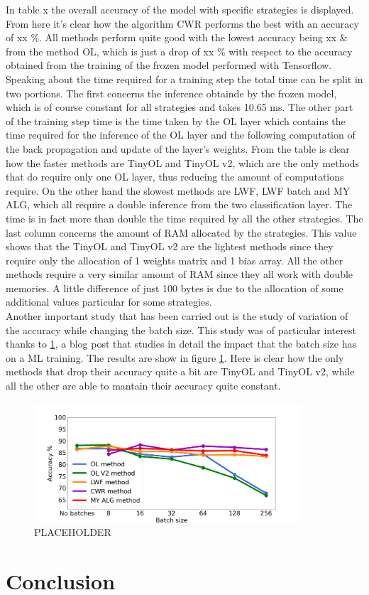 \documentclass[12pt]{report}
\begin{document}
In table x the overall accuracy of the model with specific strategies is displayed. From here it's clear how the algorithm CWR performs the best with an accuracy of xx \%. All methods perform quite good with the lowest accuracy being xx \& from the method OL, which is just a drop of xx \% with respect to the accuracy obtained from the training of the frozen model performed with Tensorflow. Speaking about the time required for a training step the total time can be split in two portions. The first concerns the inference obtainde by the frozen model, which is of course constant for all strategies and takes 10.65 ms. The other part of the training step time is the time taken by the OL layer which contains the time required for the inference of the OL layer and the following computation of the back propagation and update of the layer's weights. From the table is clear how the faster methods are TinyOL and TinyOL v2, which are the only methods that do require only one OL layer, thus reducing the amount of computations require. On the other hand the slowest methods are LWF, LWF batch and MY ALG, which all require a double inference from the two classification layer. The time is in fact more than double the time required by all the other strategies. The last column concerns the amount of RAM allocated by the strategies. This value shows that the TinyOL and TinyOL v2 are the lightest methods since they require only the allocation of 1 weights matrix and 1 bias array. All the other methods require a very similar amount of RAM since they all work with double memories. A little difference of just 100 bytes is due to the allocation of some additional values particular for some strategies.  \\
Another important study that has been carried out is the study of variation of the accuracy while changing the batch size. This study was of particular interest thanks to \ref{}, a blog post that studies in detail the impact that the batch size has on a ML training. The results are show in figure \ref{fig:batch_size_letter}. Here is clear how the only methods that drop their accuracy quite a bit are TinyOL and TinyOL v2, while all the other are able to mantain their accuracy quite constant.
%
\begin{figure}[h!]
    \centering
    \includegraphics[width=100mm]{Figures/Chapter5/batch_size_letters.png} 
    \caption{PLACEHOLDER}
    \label{fig:batch_size_letter}    
\end{figure}
%

\chapter{Conclusion}








\printbibliography
\end{document}
